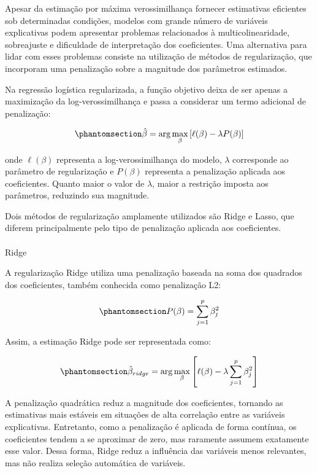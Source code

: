 \documentclass[
  brazilian,
  12pt,
  letterpaper,
  DIV=11,
  numbers=noendperiod]{scrartcl}
\makeatletter
\let\oldparagraph\paragraph
\renewcommand{\paragraph}{
    \@ifstar
      \xxxParagraphStar
      \xxxParagraphNoStar
  }
\newcommand{\xxxParagraphStar}[1]{\oldparagraph*{#1}\mbox{}}
\newcommand{\xxxParagraphNoStar}[1]{\oldparagraph{#1}\mbox{}}
\makeatother
\begin{document}
Apesar da estimação por máxima verossimilhança fornecer estimativas
eficientes sob determinadas condições, modelos com grande número de
variáveis explicativas podem apresentar problemas relacionados à
multicolinearidade, sobreajuste e dificuldade de interpretação dos
coeficientes. Uma alternativa para lidar com esses problemas consiste na
utilização de métodos de regularização, que incorporam uma penalização
sobre a magnitude dos parâmetros estimados.

Na regressão logística regularizada, a função objetivo deixa de ser
apenas a maximização da log-verossimilhança e passa a considerar um
termo adicional de penalização:

\begin{equation}\protect\phantomsection\label{eq-regularizacao-geral}{
\hat{\beta}
=
\arg\max_{\beta}
\left[
\ell(\beta)-\lambda P(\beta)
\right]
}\end{equation}

onde \(\ell(\beta)\) representa a log-verossimilhança do modelo,
\(\lambda\) corresponde ao parâmetro de regularização e \(P(\beta)\)
representa a penalização aplicada aos coeficientes. Quanto maior o valor
de \(\lambda\), maior a restrição imposta aos parâmetros, reduzindo sua
magnitude.

Dois métodos de regularização amplamente utilizados são Ridge e Lasso,
que diferem principalmente pelo tipo de penalização aplicada aos
coeficientes.

\paragraph{Ridge}\label{ridge}

A regularização Ridge utiliza uma penalização baseada na soma dos
quadrados dos coeficientes, também conhecida como penalização L2:

\begin{equation}\protect\phantomsection\label{eq-ridge-penalty}{
P(\beta)=\sum_{j=1}^{p}\beta_j^2
}\end{equation}

Assim, a estimação Ridge pode ser representada como:

\begin{equation}\protect\phantomsection\label{eq-ridge}{
\hat{\beta}_{ridge}
=
\arg\max_{\beta}
\left[
\ell(\beta)
-
\lambda
\sum_{j=1}^{p}\beta_j^2
\right]
}\end{equation}

A penalização quadrática reduz a magnitude dos coeficientes, tornando as
estimativas mais estáveis em situações de alta correlação entre as
variáveis explicativas. Entretanto, como a penalização é aplicada de
forma contínua, os coeficientes tendem a se aproximar de zero, mas
raramente assumem exatamente esse valor. Dessa forma, Ridge reduz a
influência das variáveis menos relevantes, mas não realiza seleção
automática de variáveis.
\end{document}
